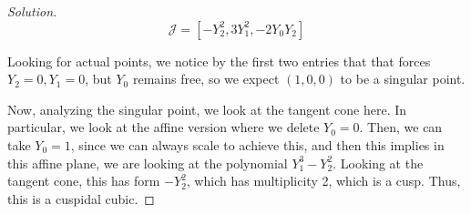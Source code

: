 \documentclass[10pt]{article}
\begin{document}
\begin{proof}[Solution]
$$\mathcal{J} = [ -Y_2^2, 3Y_1^2, -2Y_0Y_2 ]$$

Looking for actual points, we notice by the first two entries that that forces $Y_2 = 0, Y_1 = 0$, but $Y_0$ remains free, so we expect $(1,0,0)$ to be a singular point.

Now, analyzing the singular point, we look at the tangent cone here. In particular, we look at the affine version where we delete $Y_0 = 0$. Then, we can take $Y_0 = 1$, since we can always scale to achieve this, and then this implies in this affine plane, we are looking at the polynomial $Y_1^3 - Y_2^2$. Looking at the tangent cone, this has form $-Y_2^2$, which has multiplicity 2, which is a cusp. Thus, this is a cuspidal cubic.



\end{proof}
\end{document}

